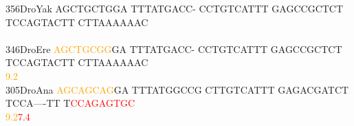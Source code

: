 \documentclass[11pt,twoside,reqno,a4paper]{article}
\begin{document}
{356\hspace*{1\charwidth}DroYak	AGCTGCTGGA	TTTATGACC-	CCTGTCATTT	GAGCCGCTCT	TCCAGTACTT	CTTAAAAAAC	\\
\hspace*{4\charwidth}\hspace*{7\charwidth}\hspace*{1\charwidth}\hspace*{1\charwidth}\hspace*{1\charwidth}\hspace*{1\charwidth}\hspace*{1\charwidth}\hspace*{1\charwidth}\\
346\hspace*{1\charwidth}DroEre	\textcolor{orange}{A}\textcolor{orange}{G}\textcolor{orange}{C}\textcolor{orange}{T}\textcolor{orange}{G}\textcolor{orange}{C}\textcolor{orange}{G}\textcolor{orange}{G}GA	TTTATGACC-	CCTGTCATTT	GAGCCGCTCT	TCCAGTACTT	CTTAAAAAAC	\\
\hspace*{4\charwidth}\hspace*{7\charwidth}\hspace*{0\charwidth}\textcolor{orange}{9.2}\hspace*{1\charwidth}\hspace*{1\charwidth}\hspace*{1\charwidth}\hspace*{1\charwidth}\hspace*{1\charwidth}\hspace*{1\charwidth}\\
305\hspace*{1\charwidth}DroAna	\textcolor{orange}{A}\textcolor{orange}{G}\textcolor{orange}{C}\textcolor{orange}{A}\textcolor{orange}{G}\textcolor{orange}{C}\textcolor{orange}{A}\textcolor{orange}{G}GA	TTTATGGCCG	CTTGTCATTT	GAGACGATCT	TCCA----TT	T\textcolor{red}{C}\textcolor{red}{C}\textcolor{red}{A}\textcolor{red}{G}\textcolor{red}{A}\textcolor{red}{G}\textcolor{red}{T}\textcolor{red}{G}\textcolor{red}{C}	\\
\hspace*{4\charwidth}\hspace*{7\charwidth}\hspace*{0\charwidth}\textcolor{orange}{9.2}\hspace*{1\charwidth}\hspace*{1\charwidth}\hspace*{1\charwidth}\hspace*{1\charwidth}\hspace*{1\charwidth}\hspace*{48\charwidth}\textcolor{red}{7.4}\hspace*{1\charwidth}\\
}
\end{document}
